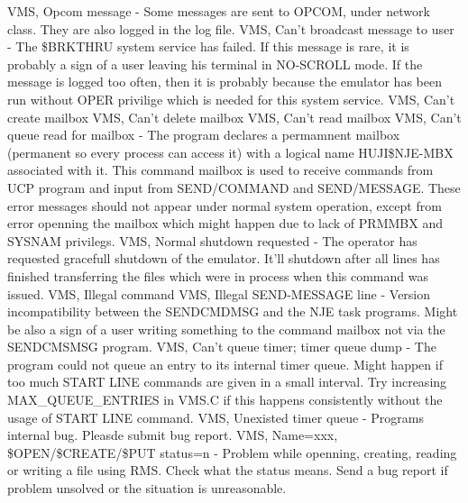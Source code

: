 \hfill\break
{\ncrBold VMS, Opcom message }
- Some messages are  sent  to  OPCOM,  under  network
class. They are also logged in the log file.
\hfill\break
{\ncrBold VMS,  Can't  broadcast message to user }
- The \$BRKTHRU system service has
failed. If this message is rare, it is probably a sign of a user leaving
his terminal in NO-SCROLL mode. If the message is logged too often, then
it is probably because the emulator has been run without OPER  privilige
which is needed for this system service.
\hfill\break
{\ncrBold VMS, Can't create mailbox}
\hfill\break
{\ncrBold VMS, Can't delete mailbox}
\hfill\break
{\ncrBold VMS, Can't read mailbox}
\hfill\break
{\ncrBold VMS,  Can't  queue  read for mailbox }
- The program declares a permamnent
mailbox (permanent so every process can access it) with a  logical  name
HUJI\$NJE-MBX associated with it. This command mailbox is used to receive
commands  from UCP program and input from SEND/COMMAND and SEND/MESSAGE.
These  error  messages  should not appear under normal system operation,
except from error openning the mailbox which might happen due to lack of
PRMMBX and SYSNAM privilegs.
\hfill\break
{\ncrBold VMS,  Normal  shutdown  requested }
- The operator has requested gracefull
shutdown of the emulator. It'll shutdown after all  lines  has  finished
transferring  the  files  which  were  in  process when this command was
issued.
\hfill\break
{\ncrBold VMS, Illegal command}
\hfill\break
{\ncrBold VMS, Illegal SEND-MESSAGE line }
-  Version  incompatibility  between  the
SENDCMDMSG  and  the  NJE  task programs. Might be also a sign of a user
writing  something  to  the  command  mailbox  not  via  the  SENDCMSMSG
program.
\hfill\break
{\ncrBold VMS,  Can't  queue timer; timer queue dump }
- The program could not queue
an entry to its internal timer queue. Might happen  if  too  much  START
LINE   commands   are   given   in  a  small  interval.  Try  increasing
MAX\_QUEUE\_ENTRIES in VMS.C if  this  happens  consistently  without  the
usage of START LINE command.
VMS,  Unexisted  timer queue - Programs internal bug. Pleasde submit bug
report.
\hfill\break
{\ncrBold VMS, Name=xxx, \$OPEN/\$CREATE/\$PUT status=n }
-  Problem  while  openning,
creating,  reading  or  writing  a file using RMS. Check what the status
means. Send a bug  report  if  problem  unsolved  or  the  situation  is
unreasonable.

